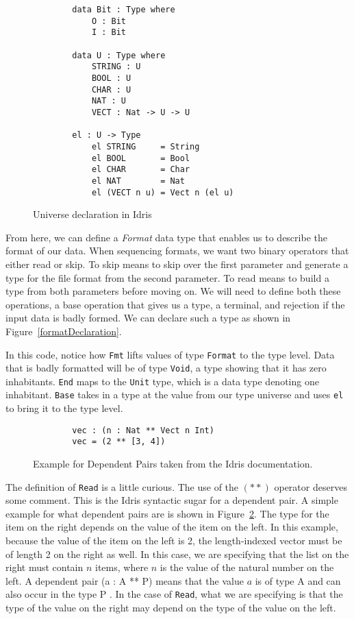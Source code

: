 \begin{figure}[h]
    \caption{Universe declaration in Idris \protect\cite{power_of_pi}}
    \label{universe}
    \begin{lstlisting}
        data Bit : Type where 
            O : Bit 
            I : Bit

        data U : Type where
            STRING : U
            BOOL : U
            CHAR : U
            NAT : U
            VECT : Nat -> U -> U
        
        el : U -> Type
            el STRING     = String
            el BOOL       = Bool
            el CHAR       = Char
            el NAT        = Nat
            el (VECT n u) = Vect n (el u)
    \end{lstlisting}
\end{figure}

From here, we can define a \textit{Format} data type that enables us to describe
the format of our data. When sequencing formats, we want two binary operators
that either read or skip. To skip means to skip over the first parameter and
generate a type for the file format from the second parameter. To read means to
build a type from both parameters before moving on. We will need to define both
these operations, a base operation that gives us a type, a terminal, and
rejection if the input data is badly formed. We can declare such a type as
shown in Figure~\ref{formatDeclaration}. 

In this code, notice how \texttt{Fmt} lifts values of type \texttt{Format} to
the type level. Data that is badly formatted will be of type \texttt{Void}, a
type showing that it has zero inhabitants. \texttt{End} maps to the
\texttt{Unit} type, which is a data type denoting one inhabitant. \texttt{Base}
takes in a type at the value from our type universe and uses \texttt{el} to
bring it to the type level. 

\begin{figure}[h]
    \caption{Example for Dependent Pairs taken from the Idris documentation.}
    \label{dependentPairExample}
    \begin{lstlisting}
        vec : (n : Nat ** Vect n Int)
        vec = (2 ** [3, 4])
    \end{lstlisting}
\end{figure}

The definition of \texttt{Read} is a little curious. The use of the $(**)$
operator deserves some comment. This is the Idris syntactic sugar for a
dependent pair. A simple example for what dependent pairs are is shown in
Figure~\ref{dependentPairExample}. The type for the item on the right depends on
the value of the item on the left. In this example, because the value of the
item on the left is 2, the length-indexed vector must be of length 2 on the
right as well. In this case, we are specifying that the list on the right must
contain $n$ items, where $n$ is the value of the natural number on the left. A
dependent pair (a : A ** P) means that the value $a$ is of type A and can also
occur in the type P \cite{tdd_book}. In the case of \texttt{Read}, what we are
specifying is that the type of the value on the right may depend on the type of
the value on the left. 

